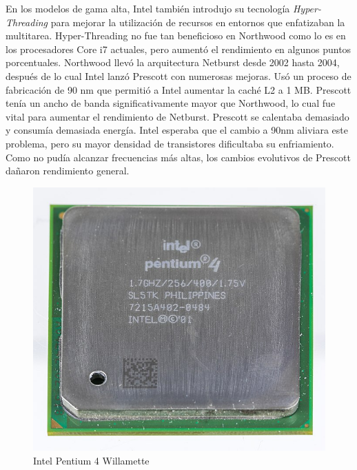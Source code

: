 En los modelos de gama alta, Intel también introdujo su tecnología \emph{Hyper-Threading} para mejorar la utilización de recursos en entornos que 
enfatizaban la multitarea. Hyper-Threading no fue tan beneficioso en Northwood como lo es en los procesadores Core i7 actuales, pero aumentó el 
rendimiento en algunos puntos porcentuales.
Northwood llevó la arquitectura Netburst desde 2002 hasta 2004, después de lo cual Intel lanzó Prescott con numerosas mejoras. Usó un proceso de 
fabricación de 90 nm que permitió a Intel aumentar la caché L2 a 1 MB.  Prescott tenía un ancho de banda significativamente mayor que Northwood, 
lo cual fue vital para aumentar el rendimiento de Netburst. Prescott se calentaba  demasiado y consumía demasiada energía. Intel esperaba que el 
cambio a 90nm aliviara este problema, pero su mayor densidad de transistores dificultaba su enfriamiento. Como no pudía alcanzar frecuencias más altas, 
los cambios evolutivos de Prescott dañaron  rendimiento general.
\begin{figure}[htb]
	\centering
	\includegraphics[scale = 0.15]{Graphics/Pentium_4_-_SL5TK-3056.jpg}
	\caption{Intel Pentium 4 Willamette}
	\label{fig:23}
\end{figure}

